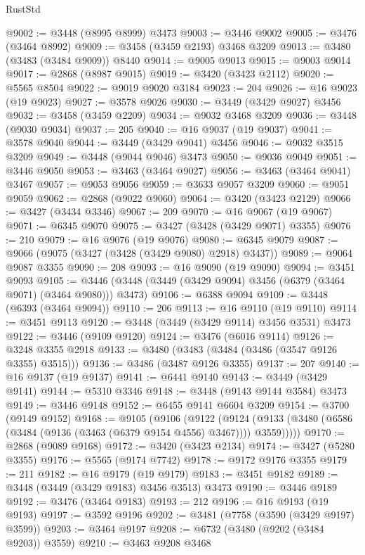 \begin{lexlean}{RustStd}
\begin{coremodule}
{\begin{coremodule}
{{{{{{{{{{{{{{{{{{{{{{{{{{{{{{{{{{{{{{{{{{{{{{{{{{{{{{{{{{{{{{{{{{{{{{{{{{{{{{{{{{{{{@9002 := @3448 (@8995 @8999) @3473
@9003 := @3446 @9002
@9005 := @3476 (@3464 @8992)
@9009 := @3458 (@3459 @2193) @3468 @3209
@9013 := @3480 (@3483 (@3484 @9009)) @8440
@9014 := @9005 @9013
@9015 := @9003 @9014
@9017 := @2868 (@8987 @9015)
@9019 := @3420 (@3423 @2112)
@9020 := @5565 @8504
@9022 := @9019 @9020 @3184
@9023 := 204
@9026 := @16 @9023 (@19 @9023)
@9027 := @3578 @9026
@9030 := @3449 (@3429 @9027) @3456
@9032 := @3458 (@3459 @2209)
@9034 := @9032 @3468 @3209
@9036 := @3448 (@9030 @9034)
@9037 := 205
@9040 := @16 @9037 (@19 @9037)
@9041 := @3578 @9040
@9044 := @3449 (@3429 @9041) @3456
@9046 := @9032 @3515 @3209
@9049 := @3448 (@9044 @9046) @3473
@9050 := @9036 @9049
@9051 := @3446 @9050
@9053 := @3463 (@3464 @9027)
@9056 := @3463 (@3464 @9041) @3467
@9057 := @9053 @9056
@9059 := @3633 @9057 @3209
@9060 := @9051 @9059
@9062 := @2868 (@9022 @9060)
@9064 := @3420 (@3423 @2129)
@9066 := @3427 (@3434 @3346)
@9067 := 209
@9070 := @16 @9067 (@19 @9067)
@9071 := @6345 @9070
@9075 := @3427 (@3428 (@3429 @9071) @3355)
@9076 := 210
@9079 := @16 @9076 (@19 @9076)
@9080 := @6345 @9079
@9087 := @9066 (@9075 (@3427 (@3428 (@3429 @9080) @2918) @3437))
@9089 := @9064 @9087 @3355
@9090 := 208
@9093 := @16 @9090 (@19 @9090)
@9094 := @3451 @9093
@9105 := @3446 (@3448 (@3449 (@3429 @9094) @3456 (@6379 (@3464 @9071) (@3464 @9080))) @3473)
@9106 := @6388 @9094
@9109 := @3448 (@6393 (@3464 @9094))
@9110 := 206
@9113 := @16 @9110 (@19 @9110)
@9114 := @3451 @9113
@9120 := @3448 (@3449 (@3429 @9114) @3456 @3531) @3473
@9122 := @3446 (@9109 @9120)
@9124 := @3476 (@6016 @9114)
@9126 := @3248 @3355 @2918
@9133 := @3480 (@3483 (@3484 (@3486 (@3547 @9126 @3355) @3515)))
@9136 := @3486 (@3487 @9126 @3355)
@9137 := 207
@9140 := @16 @9137 (@19 @9137)
@9141 := @6441 @9140
@9143 := @3449 (@3429 @9141)
@9144 := @5310 @3346
@9148 := @3448 (@9143 @9144 @3584) @3473
@9149 := @3446 @9148
@9152 := @6455 @9141 @6604 @3209
@9154 := @3700 (@9149 @9152)
@9168 := @9105
    (@9106
      (@9122
        (@9124 (@9133 (@3480 (@6586 (@3484 (@9136 (@3463 (@6379 @9154 @4556) @3467)))) @3559)))))
@9170 := @2868 (@9089 @9168)
@9172 := @3420 (@3423 @2134)
@9174 := @3427 (@5280 @3355)
@9176 := @5565 (@9174 @7742)
@9178 := @9172 @9176 @3355
@9179 := 211
@9182 := @16 @9179 (@19 @9179)
@9183 := @3451 @9182
@9189 := @3448 (@3449 (@3429 @9183) @3456 @3513) @3473
@9190 := @3446 @9189
@9192 := @3476 (@3464 @9183)
@9193 := 212
@9196 := @16 @9193 (@19 @9193)
@9197 := @3592 @9196
@9202 := @3481 (@7758 (@3590 (@3429 @9197) @3599))
@9203 := @3464 @9197
@9208 := @6732 (@3480 (@9202 (@3484 @9203)) @3559)
@9210 := @3463 @9208 @3468
}}}}}}}}}}}}}}}}}}}}}}}}}}}}}}}}}}}}}}}}}}}}}}}}}}}}}}}}}}}}}}}}}}}}}}}}}}}}}}}}}}}}}
\end{coremodule}}
\end{coremodule}
\end{lexlean}
